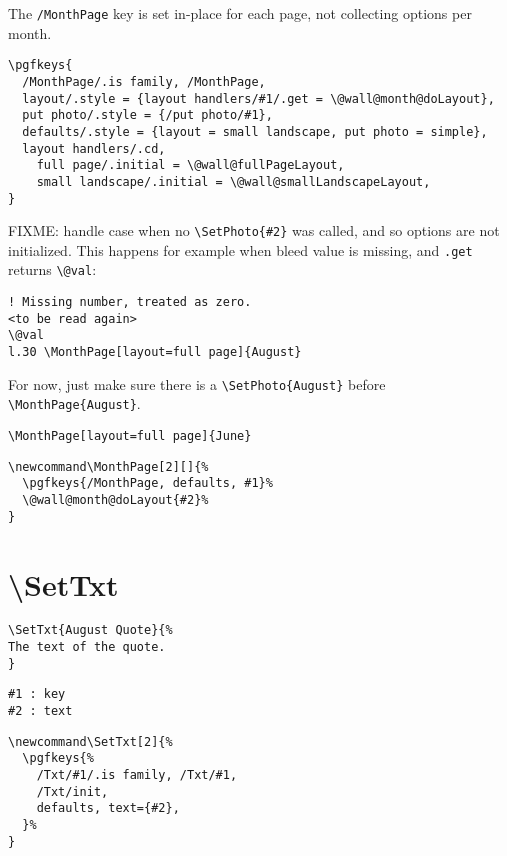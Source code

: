 \documentclass[11pt,oneside]{memoir-article}
\begin{document}
The \texttt{/MonthPage} key is set in-place for each page, not collecting options per month.

\begin{verbatim}
\pgfkeys{
  /MonthPage/.is family, /MonthPage,
  layout/.style = {layout handlers/#1/.get = \@wall@month@doLayout},
  put photo/.style = {/put photo/#1},
  defaults/.style = {layout = small landscape, put photo = simple},
  layout handlers/.cd,
    full page/.initial = \@wall@fullPageLayout,
    small landscape/.initial = \@wall@smallLandscapeLayout,
}
\end{verbatim}

FIXME: handle case when no \texttt{\textbackslash{}SetPhoto\{\#2\}} was called, and so options are not
initialized. This happens for example when bleed value is missing, and \texttt{.get}
returns \texttt{\textbackslash{}@val}:

\begin{verbatim}
! Missing number, treated as zero.
<to be read again> 
\@val 
l.30 \MonthPage[layout=full page]{August}
\end{verbatim}

For now, just make sure there is a \texttt{\textbackslash{}SetPhoto\{August\}} before \texttt{\textbackslash{}MonthPage\{August\}}.

\begin{verbatim}
\MonthPage[layout=full page]{June}
\end{verbatim}

\begin{verbatim}
\newcommand\MonthPage[2][]{%
  \pgfkeys{/MonthPage, defaults, #1}%
  \@wall@month@doLayout{#2}%
}
\end{verbatim}

\section{\textbackslash SetTxt}
\label{sec-9-6}

\begin{verbatim}
\SetTxt{August Quote}{%
The text of the quote.
}
\end{verbatim}

\begin{verbatim}
#1 : key
#2 : text
\end{verbatim}

\begin{verbatim}
\newcommand\SetTxt[2]{%
  \pgfkeys{%
    /Txt/#1/.is family, /Txt/#1,
    /Txt/init,
    defaults, text={#2},
  }%
}
\end{verbatim}
\end{document}
